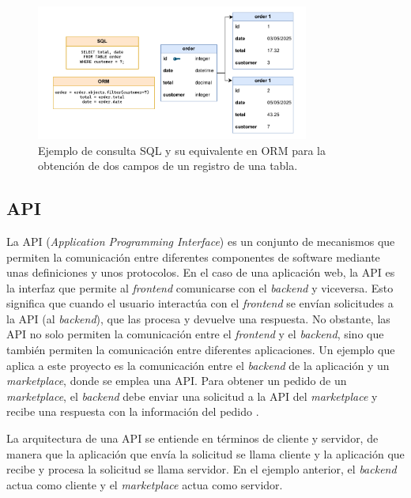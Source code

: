 \begin{figure}[H]
    \centering
    \includegraphics[width=0.8\textwidth]{figures/theoric_frame/orm_vs_sql.pdf}
    \caption{Ejemplo de consulta SQL y su equivalente en ORM para la obtención de dos campos de un registro de una tabla.}
    \label{fig:orm_vs_sql}
\end{figure}

\subsection{API}
\label{mt:subsec:api}

La API (\textit{Application Programming Interface}) es un conjunto de mecanismos que permiten la comunicación entre diferentes componentes de software mediante unas definiciones y unos protocolos. En el caso de una aplicación web, la API es la interfaz que permite al \textit{frontend} comunicarse con el \textit{backend} y viceversa. Esto significa que cuando el usuario interactúa con el \textit{frontend} se envían solicitudes a la API (al \textit{backend}), que las procesa y devuelve una respuesta. No obstante, las API no solo permiten la comunicación entre el \textit{frontend} y el \textit{backend}, sino que también permiten la comunicación entre diferentes aplicaciones. Un ejemplo que aplica a este proyecto es la comunicación entre el \textit{backend} de la aplicación y un \textit{marketplace}, donde se emplea una API. Para obtener un pedido de un \textit{marketplace}, el \textit{backend} debe enviar una solicitud a la API del \textit{marketplace} y recibe una respuesta con la información del pedido \cite{aws_api}.

La arquitectura de una API se entiende en términos de cliente y servidor, de manera que la aplicación que envía la solicitud se llama cliente y la aplicación que recibe y procesa la solicitud se llama servidor. En el ejemplo anterior, el \textit{backend} actua como cliente y el \textit{marketplace} actua como servidor.

